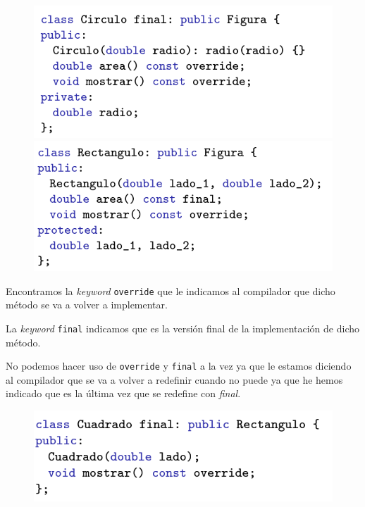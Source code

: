 \begin{figure}[h]
	\begin{minipage}{0.5\textwidth}
		\includegraphics[width=\textwidth]{Imagenes/poli6.png}
	\end{minipage}
	\hfill
	\begin{minipage}{0.5\textwidth}
		\includegraphics[width=\textwidth]{Imagenes/poli7.png}
	\end{minipage}
\end{figure}

Encontramos la \textit{keyword} \texttt{override} que le indicamos al compilador que dicho método se va a volver a implementar.

La \textit{keyword} \texttt{final} indicamos que es la versión final de la implementación de dicho método.

No podemos hacer uso de \texttt{override} y \texttt{final} a la vez ya que le estamos diciendo al compilador que se va a volver a redefinir cuando no puede ya que he hemos indicado que es la última vez que se redefine con \textit{final}.
\newpage
\begin{figure}[h]
	\begin{center}
		\includegraphics[width=\textwidth]{Imagenes/poli8.png}
	\end{center}
\end{figure}


